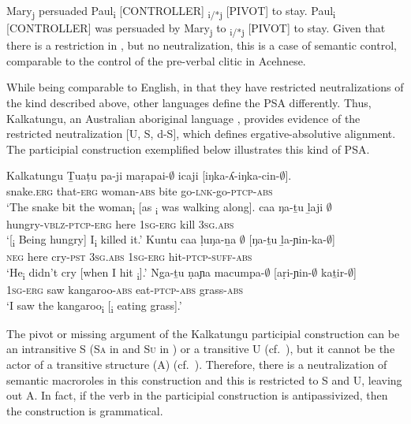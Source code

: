 \documentclass[output=paper,hidelinks]{langscibook}
\begin{document}
\ea%
   \label{ex:RRG:17}
\ea\label{ex:RRG:17a}  Mary\textsubscript{j} persuaded
Paul\textsubscript{i} [CONTROLLER] \GAP\textsubscript{i/*j} [PIVOT] to stay.
\ex\label{ex:RRG:17b} Paul\textsubscript{i} [CONTROLLER] was persuaded by Mary\textsubscript{j} to \GAP\textsubscript{i/*j} [PIVOT] to stay.
\z\z
Given that there is a restriction in , but no neutralization, this is a case of semantic control, comparable to the control of the pre-verbal clitic in Acehnese.

  While being comparable to English, in that they have restricted neutralizations of the kind described above, other languages define the PSA differently. Thus, Kalkatungu, an Australian aboriginal language \citep{Blake1979}, provides evidence of the restricted neutralization [U, S, d-S], which defines ergative-absolutive alignment. The participial construction exemplified below illustrates this kind of PSA.


\ea%
   \label{ex:RRG:18}Kalkatungu \citep[97-98]{VanValin2005}
\ea\label{ex:RRG:18a}   \gll \b{T}uaṭu    pa-ji    maṛapai-$\emptyset$   icaji  [iŋka-ʎ{}-iŋka-cin-$\emptyset$]. \\
    snake.\textsc{erg}  that-\textsc{erg}  woman-\textsc{abs}  bite  go-\textsc{lnk}{}-go-\textsc{ptcp-abs}\\
   \glt `The snake bit the woman\textsubscript{i} [as \GAP\textsubscript{i} was walking along].
\ex\label{ex:RRG:18b}    caa  ŋa-\b{t}u  \b{l}aji  $\emptyset$\\
hungry-\textsc{vblz-ptcp-erg}  here  \textsc{1sg-erg}  kill  3\textsc{sg.abs}\\
\glt `[\GAP\textsubscript{i} Being hungry] I\textsubscript{i} killed it.'
\ex\label{ex:RRG:18c} \gll Kuntu  caa  ḷuŋa-\b{n}a  $\emptyset$    [ŋa-\b{t}u  \b{l}a-ɲin-ka-$\emptyset$]\\
\textsc{neg}   here  cry-\textsc{pst}  \textsc{3sg.abs}  \textsc{1sg-erg}  hit-\textsc{ptcp-suff-abs}\\
\glt `He\textsubscript{i} didn't cry [when I hit \GAP\textsubscript{i}].'
\ex\label{ex:RRG:18d} \gll *Nga-\b{t}u  ṇaɲa  macumpa-$\emptyset$  [aṛi-ɲin-$\emptyset$  ka\b{t}ir-$\emptyset$]\\
\textsc{1sg-erg}  saw  kangaroo-\textsc{abs}  eat-\textsc{ptcp-abs}  grass-\textsc{abs}\\
\glt `I saw the kangaroo\textsubscript{i} [\GAP\textsubscript{i} eating grass].'
\z\z

  The pivot or missing argument of the Kalkatungu participial construction can be an intransitive S (S\textsc{a} in  and S\textsc{u} in ) or a transitive U (cf.\ ), but it cannot be the actor of a transitive structure (A) (cf.\ ). Therefore, there is a neutralization of semantic macroroles in this construction and this is restricted to S and U, leaving out A. In fact, if the verb in the participial construction is antipassivized, then the construction is grammatical.
\end{document}
